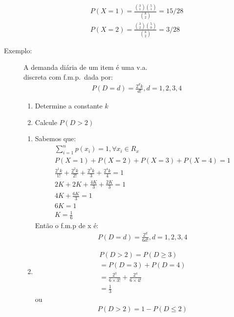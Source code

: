 \documentclass[11pt,a4paper]{book}
\begin{document}
\begin{description}
       \begin{align*}
         P(X=1) = \frac{ \binom{3}{1} \binom{5}{1} }{ \binom{8}{2}}= 15/28 \\
         P(X=2) = \frac{ \binom{3}{2} \binom{5}{0} }{ \binom{8}{2}}= 3/28 
       \end{align*}
     \item [Exemplo:] A demanda diária de um item é uma v.a.\\ discreta com f.m.p.\ dada por: 
       \begin{align}
         P(D=d)=\frac{2^d k}{d!}, d=1,2,3,4
       \end{align}
       \begin{enumerate}[label=(\alph*)]
         \item Determine a constante $k$
         \item Calcule $P(D>2)$
       \end{enumerate}
       \begin{enumerate}[label=(\alph*)]
         \item Sabemos que: 
           \begin{align*}
             \sum^{n}_{i=1} p(x_i)=1, \forall x_i \in R_{x}\\
             P(X=1)+P(X=2)+P(X=3)+P(X=4)=1\\
             \frac{2^1 k}{1!}+\frac{2^2 k}{2!}+\frac{2^3 k}{3\!}+\frac{2^4 k}{4\!}=1\\
             2K + 2K+ \frac{4K}{3}+\frac{2K}{3}=1 \\
             4K+\frac{6K}{3}=1 \\
             6K=1\\
             K=\frac{1}{6}
           \end{align*}
           Então o f.m.p de x é: 
           \begin{align*}
             P(D=d)=\frac{2^d}{6d!}, d=1,2,3,4
           \end{align*}
         \item 
           \begin{align*}
             P(D>2)=P(D \geq 3) \\
             =P(D=3)+P(D=4)\\
             =\frac{2^3}{6\times 3!}+ \frac{2^4}{6\times 4!}\\
             =\frac{1}{3}
           \end{align*}
           ou 
           \begin{align*}
             P(D>2)=1-P(D\le 2)\\

\end{align*}
\end{enumerate}
\end{description}
\end{document}
